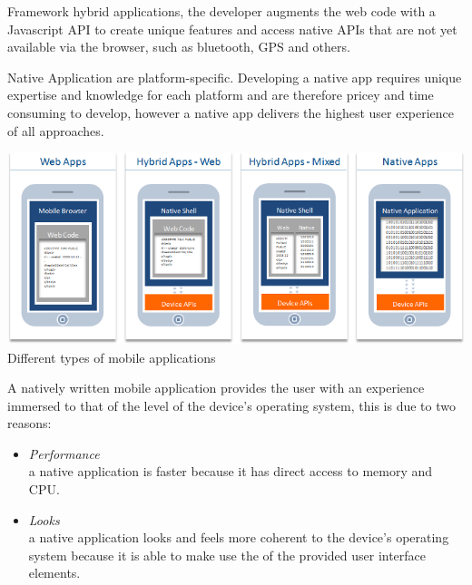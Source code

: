 Framework hybrid applications, the developer augments the web code with a Javascript API to create unique features and
access native APIs that are not yet available via the browser, such as bluetooth, GPS and others.
 
Native Application are platform-specific. Developing a native app requires unique expertise and knowledge for each platform and are therefore pricey and time consuming to develop, however a native app delivers the highest user experience of all approaches.

\begin{centering}
\includegraphics[scale=0.7]{images/apptypesdefined.png}\\{Different types of mobile applications\cite{IBM-Worklight2012}}\\
\end{centering}

A natively written mobile application provides the user with an experience immersed to that of the level of the device's operating system, this is due to two reasons:
\begin{itemize}
\item
\emph{Performance}\\
a native application is faster because it has direct access to memory and CPU.
\item \emph{Looks}\\
a native application looks and feels more coherent to the device's operating system because it is able to make use the of the provided user interface elements.
\end{itemize}